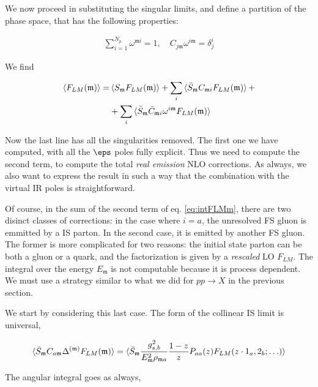 \documentclass[11pt]{report}
\begin{document}
We now proceed in substituting the singular limits, and define a partition of the phase space, that has the following properties: 

\begin{align}
    \sum_{i=1}^{N_p}\omega^{\mathfrak{m}i} = 1, \quad C_{j\mathfrak{m}}\omega^{i\mathfrak{m}} = \delta_j^i
\end{align}

We find 

\begin{align}
    \label{eq:intFLMm}
    \braket{F_{LM}(\mathfrak{m})} = &\braket{S_{\mathfrak{m}}F_{LM}(\mathfrak{m})} + \sum_i \braket{\bar{S}_{\mathfrak{m}}C_{\mathfrak{m} i}F_{LM}(\mathfrak{m})} + \notag \\ 
    &+\sum_i \braket{\bar{S}_{\mathfrak{m}}\bar{C}_{\mathfrak{m} i} \omega^{i\mathfrak{m}} F_{LM}(\mathfrak{m})}
\end{align}

Now the last line has all the singularities removed. The first one we have computed, with all the \(\eps\) poles fully explicit. Thus we need to compute the second term, to compute the total \emph{real emission} NLO corrections. As always, we also want to express the result in such a way that the combination with the virtual IR poles is straightforward. 

Of course, in the sum of the second term of eq. \ref{eq:intFLMm}, there are two disinct classes of corrections: in the case where \(i = a\), the unresolved FS gluon is emmitted by a IS parton. In the second case, it is emitted by another FS gluon. The former is more complicated for two reasons: the initial state parton can be both a gluon or a quark, and the factorization is given by a \emph{rescaled} LO \(F_{LM}\). The integral over the energy \(E_{\mathfrak{m}}\) is not computable because it is process dependent. We must use a strategy similar to what we did for \(pp \to X\) in the previous section.   

We start by considering this last case. The form of the collinear IS limit is universal, 

\begin{align}
    \braket{\bar{S}_{\mathfrak{m}}C_{a\mathfrak{m}}\Delta^{(\mathfrak{m})}F_{LM}(\mathfrak{m})} = \braket{\bar{S}_{\mathfrak{m}}\frac{g^2_{s,b}}{E^2_{\mathfrak{m}}\rho_{\mathfrak{m}a}} \frac{1-z}{z}P_{aa}(z)F_{LM}(z\cdot 1_a, 2_b ; \ldots)}
\end{align}

The angular integral goes as always, 
\end{document}
